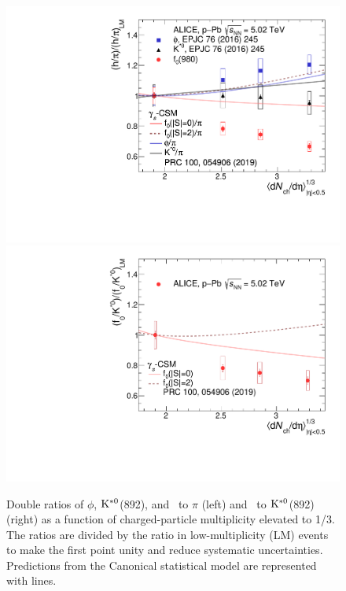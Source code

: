 \begin{figure}[!hbt]
	\centering
	\includegraphics[width=0.49 \textwidth]{figures/Fig4_dr_pion_addCSM_addpar.pdf} 
        \includegraphics[width=0.49 \textwidth]{figures/Fig4_dr_kstar_addCSM.pdf} 
	\caption{ Double ratios of $\phi$, $\rm{}K^{*0}$(892), and \fzero~to $\pi$ (left) and \fzero~to $\rm{}K^{*0}$(892) (right) as a function of charged-particle multiplicity elevated to 1/3. The ratios are divided by the ratio in low-multiplicity (LM) events to make the first point unity and reduce systematic uncertainties. Predictions from the Canonical statistical model are represented with lines. }
	\label{fig:f0piAddCSM}
\end{figure}

